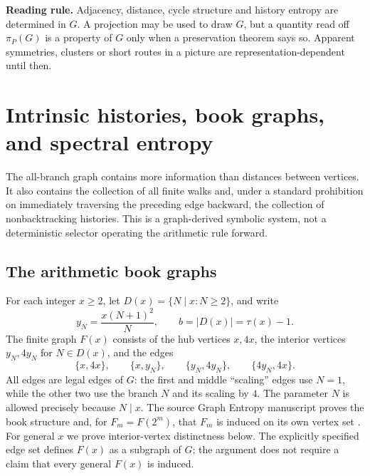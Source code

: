 \documentclass[11pt,a4paper]{article}
\theoremstyle{definition}\newtheorem{definition}[theorem]{Definition}
\begin{document}
\begin{takeaway}
\textbf{Reading rule.} Adjacency, distance, cycle structure and history entropy are determined in $G$. A projection may be used to draw $G$, but a quantity read off $\pi_P(G)$ is a property of $G$ only when a preservation theorem says so. Apparent symmetries, clusters or short routes in a picture are representation-dependent until then.
\end{takeaway}


\section{Intrinsic histories, book graphs, and spectral entropy}
\label{sec:entropy}
The all-branch graph contains more information than distances between vertices. It also contains the collection of all finite walks and, under a standard prohibition on immediately traversing the preceding edge backward, the collection of nonbacktracking histories. This is a graph-derived symbolic system, not a deterministic selector operating the arithmetic rule forward.

\subsection{The arithmetic book graphs}
For each integer $x\ge2$, let $D(x)=\{N\mid x:N\ge2\}$, and write
\begin{equation}\label{eq:bookdefs}
y_N=\frac{x(N+1)^2}{N},\qquad b=|D(x)|=\tau(x)-1.
\end{equation}
The finite graph $F(x)$ consists of the hub vertices $x,4x$, the interior vertices $y_N,4y_N$ for $N\in D(x)$, and the edges
\begin{equation}\label{eq:bookedges}
\{x,4x\},\qquad\{x,y_N\},\qquad\{y_N,4y_N\},\qquad\{4y_N,4x\}.
\end{equation}
All edges are legal edges of $G$: the first and middle ``scaling'' edges use $N=1$, while the other two use the branch $N$ and its scaling by $4$. The parameter $N$ is allowed precisely because $N\mid x$. The source Graph Entropy manuscript proves the book structure and, for $F_m=F(2^m)$, that $F_m$ is induced on its own vertex set \cite{entropy}. For general $x$ we prove interior-vertex distinctness below. The explicitly specified edge set defines $F(x)$ as a subgraph of $G$; the argument does not require a claim that every general $F(x)$ is induced.
\end{document}
